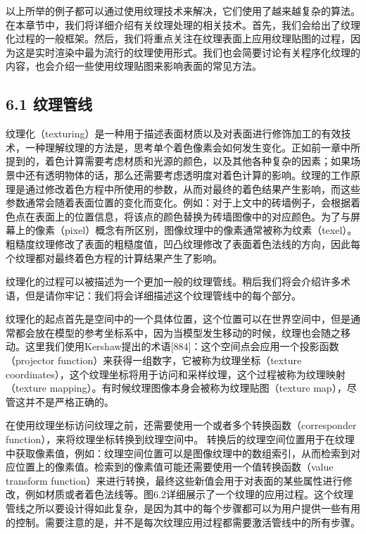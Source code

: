 \documentclass[
  paper=a4,
  ,captions=tableheading
]{scrartcl}
\begin{document}
以上所举的例子都可以通过使用纹理技术来解决，它们使用了越来越复杂的算法。在本章节中，我们将详细介绍有关纹理处理的相关技术。首先，我们会给出了纹理化过程的一般框架。然后，我们将重点关注在纹理表面上应用纹理贴图的过程，因为这是实时渲染中最为流行的纹理使用形式。我们也会简要讨论有关程序化纹理的内容，也会介绍一些使用纹理贴图来影响表面的常见方法。

\subsection{6.1 纹理管线}\label{ux7eb9ux7406ux7ba1ux7ebf}

纹理化（texturing）是一种用于描述表面材质以及对表面进行修饰加工的有效技术，一种理解纹理的方法是，思考单个着色像素会如何发生变化。正如前一章中所提到的，着色计算需要考虑材质和光源的颜色，以及其他各种复杂的因素；如果场景中还有透明物体的话，那么还需要考虑透明度对着色计算的影响。纹理的工作原理是通过修改着色方程中所使用的参数，从而对最终的着色结果产生影响，而这些参数通常会随着表面位置的变化而变化。例如：对于上文中的砖墙例子，会根据着色点在表面上的位置信息，将该点的颜色替换为砖墙图像中的对应颜色。为了与屏幕上的像素（pixel）概念有所区别，图像纹理中的像素通常被称为纹素（texel）。粗糙度纹理修改了表面的粗糙度值，凹凸纹理修改了表面着色法线的方向，因此每个纹理都对最终着色方程的计算结果产生了影响。

纹理化的过程可以被描述为一个更加一般的纹理管线。稍后我们将会介绍许多术语，但是请你牢记：我们将会详细描述这个纹理管线中的每个部分。

纹理化的起点首先是空间中的一个具体位置，这个位置可以在世界空间中，但是通常都会放在模型的参考坐标系中，因为当模型发生移动的时候，纹理也会随之移动。这里我们使用Kershaw提出的术语{[}884{]}：这个空间点会应用一个投影函数（projector
function）来获得一组数字，它被称为纹理坐标（texture
coordinates），这个纹理坐标将用于访问和采样纹理，这个过程被称为纹理映射（texture
mapping）。有时候纹理图像本身会被称为纹理贴图（texture
map），尽管这并不是严格正确的。

在使用纹理坐标访问纹理之前，还需要使用一个或者多个转换函数（corresponder
function），来将纹理坐标转换到纹理空间中。
转换后的纹理空间位置用于在纹理中获取像素值，例如：纹理空间位置可以是图像纹理中的数组索引，从而检索到对应位置上的像素值。检索到的像素值可能还需要使用一个值转换函数（value
transform
function）来进行转换，最终这些新值会用于对表面的某些属性进行修改，例如材质或者着色法线等。图6.2详细展示了一个纹理的应用过程。这个纹理管线之所以要设计得如此复杂，是因为其中的每个步骤都可以为用户提供一些有用的控制。需要注意的是，并不是每次纹理应用过程都需要激活管线中的所有步骤。
\end{document}
